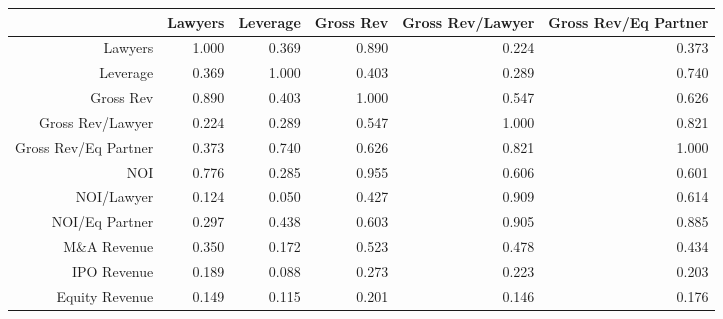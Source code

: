\begin{table}[ht]
\centering
\begin{tabular}{rrrrrr}
  \hline
 & Lawyers & Leverage & Gross Rev & Gross Rev/Lawyer & Gross Rev/Eq Partner \\ 
  \hline
Lawyers & 1.000 & 0.369 & 0.890 & 0.224 & 0.373 \\ 
  Leverage & 0.369 & 1.000 & 0.403 & 0.289 & 0.740 \\ 
  Gross Rev & 0.890 & 0.403 & 1.000 & 0.547 & 0.626 \\ 
  Gross Rev/Lawyer & 0.224 & 0.289 & 0.547 & 1.000 & 0.821 \\ 
  Gross Rev/Eq Partner & 0.373 & 0.740 & 0.626 & 0.821 & 1.000 \\ 
  NOI & 0.776 & 0.285 & 0.955 & 0.606 & 0.601 \\ 
  NOI/Lawyer & 0.124 & 0.050 & 0.427 & 0.909 & 0.614 \\ 
  NOI/Eq Partner & 0.297 & 0.438 & 0.603 & 0.905 & 0.885 \\ 
  M\&A Revenue & 0.350 & 0.172 & 0.523 & 0.478 & 0.434 \\ 
  IPO Revenue & 0.189 & 0.088 & 0.273 & 0.223 & 0.203 \\ 
  Equity Revenue & 0.149 & 0.115 & 0.201 & 0.146 & 0.176 \\ 
   \hline
\end{tabular}
\end{table}
